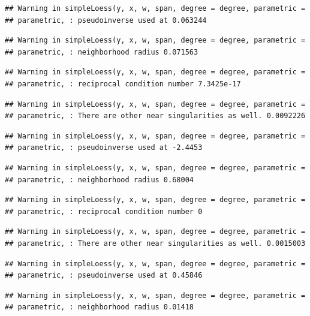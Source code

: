 \documentclass[]{article}
\begin{document}
\begin{verbatim}
## Warning in simpleLoess(y, x, w, span, degree = degree, parametric =
## parametric, : pseudoinverse used at 0.063244
\end{verbatim}

\begin{verbatim}
## Warning in simpleLoess(y, x, w, span, degree = degree, parametric =
## parametric, : neighborhood radius 0.071563
\end{verbatim}

\begin{verbatim}
## Warning in simpleLoess(y, x, w, span, degree = degree, parametric =
## parametric, : reciprocal condition number 7.3425e-17
\end{verbatim}

\begin{verbatim}
## Warning in simpleLoess(y, x, w, span, degree = degree, parametric =
## parametric, : There are other near singularities as well. 0.0092226
\end{verbatim}

\begin{verbatim}
## Warning in simpleLoess(y, x, w, span, degree = degree, parametric =
## parametric, : pseudoinverse used at -2.4453
\end{verbatim}

\begin{verbatim}
## Warning in simpleLoess(y, x, w, span, degree = degree, parametric =
## parametric, : neighborhood radius 0.68004
\end{verbatim}

\begin{verbatim}
## Warning in simpleLoess(y, x, w, span, degree = degree, parametric =
## parametric, : reciprocal condition number 0
\end{verbatim}

\begin{verbatim}
## Warning in simpleLoess(y, x, w, span, degree = degree, parametric =
## parametric, : There are other near singularities as well. 0.0015003
\end{verbatim}

\begin{verbatim}
## Warning in simpleLoess(y, x, w, span, degree = degree, parametric =
## parametric, : pseudoinverse used at 0.45846
\end{verbatim}

\begin{verbatim}
## Warning in simpleLoess(y, x, w, span, degree = degree, parametric =
## parametric, : neighborhood radius 0.01418
\end{verbatim}
\end{document}
